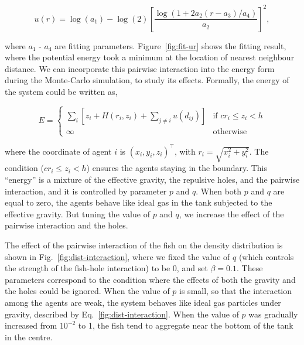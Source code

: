 \documentclass[11pt,twoside]{report}
\begin{document}
\begin{equation}
	u(r) = \log(a_1) - \log(2)\left[
		\frac{
			\log(1 + 2a_2(r-a_3)/a_4)
		}{a_2}
	\right]^2,
\label{eq:fit-ur}
\end{equation}


\noindent where $a_1$ - $a_4$ are fitting parameters. Figure~\ref{fig:fit-ur} shows the fitting result, where the potential energy took a minimum at the location of nearest neighbour distance.
We can incorporate this pairwise interaction into the energy form during the Monte-Carlo simulation, to study its effects. Formally, the energy of the system could be written as,


\begin{equation}
	E = \left\{ \begin{array}{ll}
		\sum_i\left[
			z_i + H(r_i, z_i) + 
			\sum_{j \neq i}{u(d_{ij})} 
			\right]
			&  \mbox{if $c r_i \le z_i < h$}\\
		\infty & \mbox{otherwise}
	\end{array}\right.
\label{eq:model-density}
\end{equation}



\noindent where the coordinate of agent $i$ is $(x_i, y_i, z_i)^\top$, with $r_i = \sqrt{x_i^2 + y_i^2}$. The condition ($c r_i \le z_i < h$) ensures the agents staying in the boundary. This ``energy'' is a mixture of the effective gravity, the repulsive holes, and the pairwise interaction, and it is controlled by parameter $p$ and $q$.
When both $p$ and $q$ are equal to zero, the agents behave like ideal gas in the tank subjected to the effective gravity. But tuning the value of $p$ and $q$, we increase the effect of the pairwise interaction and the holes.


The effect of the pairwise interaction of the fish on the density distribution is shown in Fig.~\ref{fig:dist-interaction}, where we fixed the value of $q$ (which controls the strength of the fish-hole interaction) to be $0$, and set $\beta=0.1$. These parameters correspond to the condition where the effects of both the gravity and the holes could be ignored.
When the value of $p$ is small, so that the interaction among the agents are weak, the system behaves like ideal gas particles under gravity, described by Eq.~\ref{fig:dist-interaction}. When the value of $p$ was gradually increased from $10^{-2}$ to 1, the fish tend to aggregate near the bottom of the tank in the centre.
\end{document}

